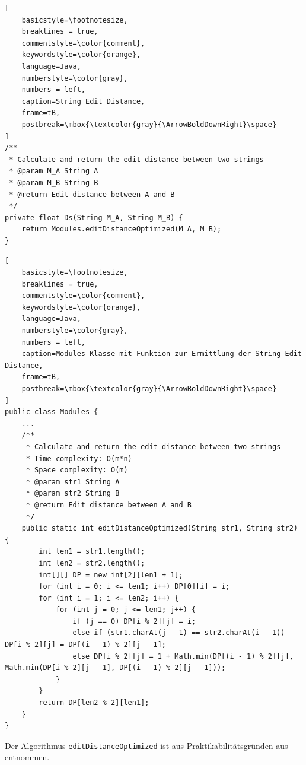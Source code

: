 \begin{lstlisting}[
    basicstyle=\footnotesize,
    breaklines = true,
    commentstyle=\color{comment},
    keywordstyle=\color{orange},
    language=Java,
    numberstyle=\color{gray},
    numbers = left,
    caption=String Edit Distance,
    frame=tB,
    postbreak=\mbox{\textcolor{gray}{\ArrowBoldDownRight}\space}
]
/**
 * Calculate and return the edit distance between two strings
 * @param M_A String A
 * @param M_B String B
 * @return Edit distance between A and B
 */
private float Ds(String M_A, String M_B) {
    return Modules.editDistanceOptimized(M_A, M_B);
}
\end{lstlisting}
\begin{lstlisting}[
    basicstyle=\footnotesize,
    breaklines = true,
    commentstyle=\color{comment},
    keywordstyle=\color{orange},
    language=Java,
    numberstyle=\color{gray},
    numbers = left,
    caption=Modules Klasse mit Funktion zur Ermittlung der String Edit Distance,
    frame=tB,
    postbreak=\mbox{\textcolor{gray}{\ArrowBoldDownRight}\space}
]
public class Modules {
    ...
    /**
     * Calculate and return the edit distance between two strings
     * Time complexity: O(m*n)
     * Space complexity: O(m)
     * @param str1 String A
     * @param str2 String B
     * @return Edit distance between A and B
     */
    public static int editDistanceOptimized(String str1, String str2) {
        int len1 = str1.length();
        int len2 = str2.length();
        int[][] DP = new int[2][len1 + 1];
        for (int i = 0; i <= len1; i++) DP[0][i] = i;
        for (int i = 1; i <= len2; i++) {
            for (int j = 0; j <= len1; j++) {
                if (j == 0) DP[i % 2][j] = i;
                else if (str1.charAt(j - 1) == str2.charAt(i - 1)) DP[i % 2][j] = DP[(i - 1) % 2][j - 1];
                else DP[i % 2][j] = 1 + Math.min(DP[(i - 1) % 2][j], Math.min(DP[i % 2][j - 1], DP[(i - 1) % 2][j - 1]));
            }
        }
        return DP[len2 % 2][len1];
    }
}
\end{lstlisting}

Der Algorithmus \texttt{editDistanceOptimized} ist aus Praktikabilitätsgründen aus~\cite{editdistance}
entnommen.

